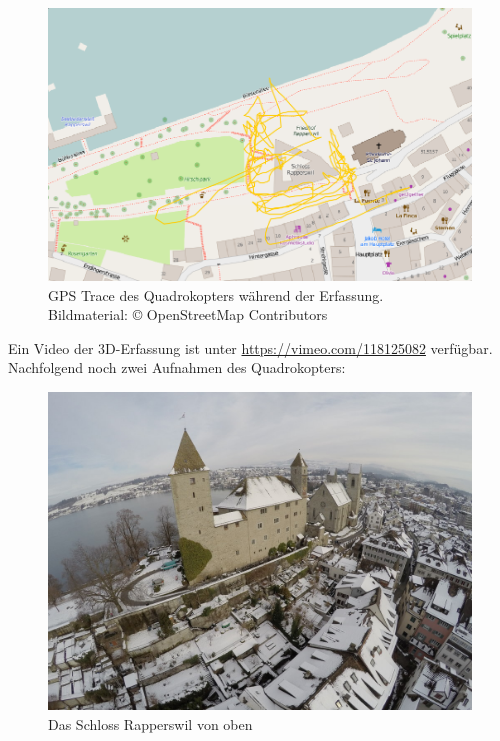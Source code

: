 \begin{figure}[H]
	\centering
	\includegraphics[width=\textwidth]{images/gpstrace_mapnik.png}
	\caption{GPS Trace des Quadrokopters während der Erfassung.\\Bildmaterial:
		\copyright{} OpenStreetMap Contributors}
	\label{img:gpstrace-mapnik}
\end{figure}

\noindent Ein Video der 3D-Erfassung ist unter \url{https://vimeo.com/118125082}
verfügbar. Nachfolgend noch zwei Aufnahmen des Quadrokopters:

\begin{figure}[H]
	\centering
	\includegraphics[width=\textwidth]{images/drone-pic-1.jpg}
	\caption{Das Schloss Rapperswil von oben}
	\label{img:drone-pic-1}
\end{figure}

